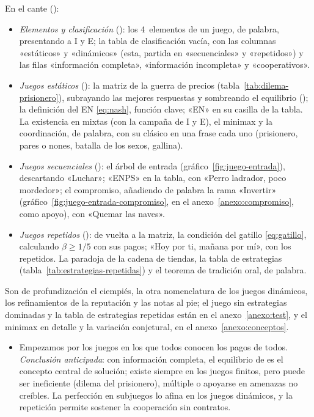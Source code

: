 \documentclass[11pt]{article}
\begin{document}
\begin{notaopositor}
En el cante ():
\begin{itemize}
\item \emph{Elementos y clasificación} (): los 4~elementos de un juego, de palabra, presentando a I y E; la tabla de clasificación vacía, con las columnas «estáticos» y «dinámicos» (esta, partida en «secuenciales» y «repetidos») y las filas «información completa», «información incompleta» y «cooperativos».
\item \emph{Juegos estáticos} (): la matriz de la guerra de precios (tabla~\ref{tab:dilema-prisionero}), subrayando las mejores respuestas y sombreando el equilibrio (); la definición del EN \eqref{eq:nash}, función clave; «EN» en su casilla de la tabla. La existencia en mixtas (con la campaña de \textup{I} y E), el minimax y la coordinación, de palabra, con su clásico en una frase cada uno (prisionero, pares o nones, batalla de los sexos, gallina).
\item \emph{Juegos secuenciales} (): el árbol de entrada (gráfico~\ref{fig:juego-entrada}), descartando «Luchar»; «ENPS» en la tabla, con «Perro ladrador, poco mordedor»; el compromiso, añadiendo de palabra la rama «Invertir» (gráfico~\ref{fig:juego-entrada-compromiso}, en el anexo~\ref{anexo:compromiso}, como apoyo), con «Quemar las naves».
\item \emph{Juegos repetidos} (): de vuelta a la matriz, la condición del gatillo \eqref{eq:gatillo}, calculando $\beta\geq1/5$ con sus pagos; «Hoy por ti, mañana por mí», con los repetidos. La paradoja de la cadena de tiendas, la tabla de estrategias (tabla~\ref{tab:estrategias-repetidas}) y el teorema de tradición oral, de palabra.
\end{itemize}
Son de profundización el ciempiés, la otra nomenclatura de los juegos dinámicos, los refinamientos de la reputación y las notas al pie; el juego sin estrategias dominadas y la tabla de estrategias repetidas están en el anexo~\ref{anexo:test}, y el minimax en detalle y la variación conjetural, en el anexo~\ref{anexo:conceptos}.
\end{notaopositor}

\begin{itemize}
\item Empezamos por los juegos en los que todos conocen los pagos de todos. \emph{Conclusión anticipada}: con información completa, el equilibrio de  es el concepto central de solución; existe siempre en los juegos finitos, pero puede ser ineficiente (dilema del prisionero), múltiple o apoyarse en amenazas no creíbles. La perfección en subjuegos lo afina en los juegos dinámicos, y la repetición permite sostener la cooperación sin contratos.
\end{itemize}
\end{document}
